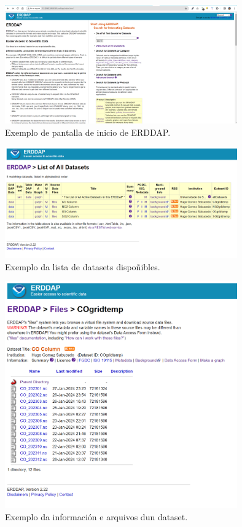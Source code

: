 \begin{figure}
    \centerline{\includegraphics[width=10cm]{figuras/erddap.png}}
    \caption{Exemplo de pantalla de inicio de ERDDAP.}
    \label{fig:erddap}
\end{figure}

\begin{figure}
    \centerline{\includegraphics[width=10cm]{figuras/datasets.png}}
    \caption{Exemplo da lista de datasets dispoñibles.}
    \label{fig:listaDatasets}
\end{figure}

\begin{figure}
    \centerline{\includegraphics[width=10cm]{figuras/exemploDataset.png}}
    \caption{Exemplo da información e arquivos dun dataset.}
    \label{fig:datasetCO}
\end{figure}

